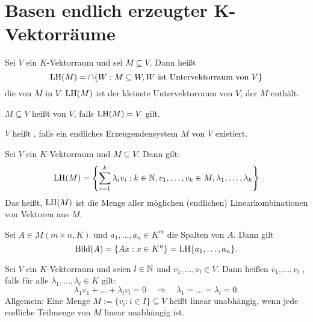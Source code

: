 \section{Basen endlich erzeugter $\mathbf{K}$-Vektorräume}

\begin{definition}
	\label{def:I.8.1}
	Sei $V$ ein $K$-Vektorraum und sei $M \subseteq V$.
	Dann heißt
	\[
		\operatorname{LH}(M) = \cap\{W : M \subseteq W, W \text{ ist Untervektorraum von } V\}
	\]
	die  von $M$ in $V$.
	$\operatorname{LH}(M)$ ist der kleinste Untervektorraum von $V$, der $M$ enthält.
	
	$M \subseteq V$ heißt  von $V$, falls $\operatorname{LH}(M) = V$ gilt.
	
	$V$ heißt , falls ein endliches Erzeugendensystem $M$ von $V$ existiert.
\end{definition}

\setcounter{definition}{2}
\begin{lemma}
	\label{lemma:I.8.3}
	Sei $V$ ein $K$-Vektorraum und $M \subseteq V$.
	Dann gilt:
	\[
		\operatorname{LH}(M) = \left\{\sum_{i=1}^{k} \lambda_i v_i : k \in \mathbb{N}, v_1,\dots, v_k \in M, \lambda_1,\dots,\lambda_k\right\}
	\]
	Das heißt, $\operatorname{LH}(M)$ ist die Menge aller möglichen (endlichen) Linearkombinationen von Vektoren aus $M$.
\end{lemma}

\begin{beispiel}
	\label{bsp:I.8.4}
	Sei $A \in M(m \times n, K)$ und $a_1, \dots, a_n \in K^m$ die Spalten von $A$.
	Dann gilt
	\[
		\operatorname{Bild}(A) = \{Ax : x \in K^n\} = \operatorname{LH}\{a_1,\dots,a_n\}.
	\]
\end{beispiel}

\begin{definition}
	\label{def:I.8.5}
	Sei $V$ ein $K$-Vektorraum und seien $l \in \mathbb{N}$ und $v_1,\dots, v_l \in V$.
	Dann heißen $v_1,\dots,v_l$ , falls für alle $\lambda_1, \dots, \lambda_l \in K$ gilt:
	\[
		\lambda_1 v_1 + \dots + \lambda_l v_l = 0 \quad \Rightarrow \quad \lambda_1 = \dots = \lambda_l = 0.
	\]
	Allgemein: Eine Menge $M := \{v_i : i \in I\} \subseteq V$ heißt linear unabhängig, wenn jede endliche Teilmenge von $M$ linear unabhängig ist.
\end{definition}

